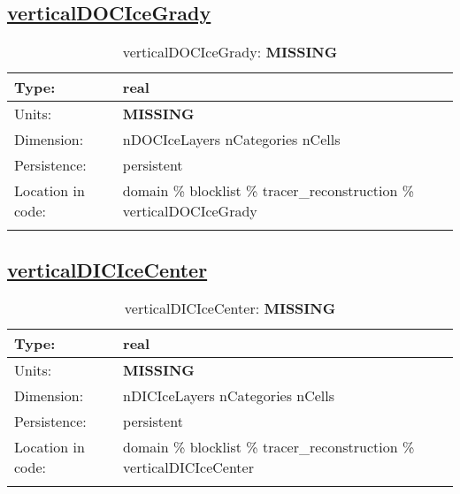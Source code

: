 \subsection[verticalDOCIceGrady]{\hyperref[sec:var_tab_tracer_reconstruction]{verticalDOCIceGrady}}
\label{subsec:var_sec_tracer_reconstruction_verticalDOCIceGrady}
\begin{center}
\begin{longtable}{| p{2.0in} | p{4.0in} |}
        \hline 
        Type: & real \\
        \hline 
        Units: & {\bf \color{red} MISSING} \\
        \hline 
        Dimension: & nDOCIceLayers nCategories nCells \\
        \hline 
        Persistence: & persistent \\
        \hline 
         Location in code: & domain \% blocklist \% tracer\_reconstruction \% verticalDOCIceGrady \\
         \hline 
    \caption{verticalDOCIceGrady: {\bf \color{red} MISSING}}
\end{longtable}
\end{center}
\subsection[verticalDICIceCenter]{\hyperref[sec:var_tab_tracer_reconstruction]{verticalDICIceCenter}}
\label{subsec:var_sec_tracer_reconstruction_verticalDICIceCenter}
\begin{center}
\begin{longtable}{| p{2.0in} | p{4.0in} |}
        \hline 
        Type: & real \\
        \hline 
        Units: & {\bf \color{red} MISSING} \\
        \hline 
        Dimension: & nDICIceLayers nCategories nCells \\
        \hline 
        Persistence: & persistent \\
        \hline 
         Location in code: & domain \% blocklist \% tracer\_reconstruction \% verticalDICIceCenter \\
         \hline 
    \caption{verticalDICIceCenter: {\bf \color{red} MISSING}}
\end{longtable}
\end{center}
